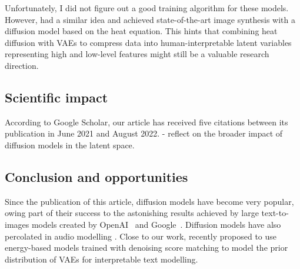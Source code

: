Unfortunately, I did not figure out a good training algorithm for these models. However, \citet{rissanen2022generative} had a similar idea and achieved state-of-the-art image synthesis with a diffusion model based on the heat equation. This hints that combining heat diffusion with VAEs to compress data into human-interpretable latent variables representing high and low-level features might still be a valuable research direction.

\subsection{Scientific impact}

According to Google Scholar, our article has received five citations between its publication in June 2021 and August 2022.
- reflect on the broader impact of diffusion models in the latent space.

\subsection{Conclusion and opportunities}
Since the publication of this article, diffusion models have become very popular, owing part of their success to the astonishing results achieved by large text-to-images models created by OpenAI~\citep[$\text{DALL}\cdot\text{E } 2$][]{ramesh2022hierarchical} and Google~\citep[Imagen][]{saharia2022photorealistic}. Diffusion models have also percolated in audio modelling \citep{kong2020diffwave}. Close to our work, \citet{yu2022latent} recently proposed to use energy-based models trained with denoising score matching to model the prior distribution of VAEs for interpretable text modelling.

